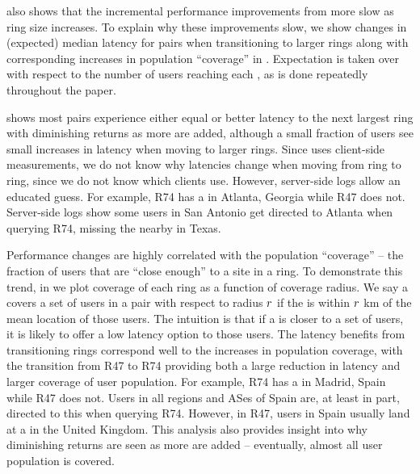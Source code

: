 \documentclass[sigconf,letterpaper,nonacm,10pt,anonymous]{acmart}
\begin{document}
 also shows that the incremental
performance improvements from more \feplural slow as ring size
increases. To explain why these improvements slow, we show changes in
(expected) median latency for \metroas pairs when transitioning to
larger rings along with corresponding increases in population
``coverage'' in .
Expectation is taken over \feplural with respect to the number of users
reaching each \fe, as is done repeatedly throughout the paper.

 shows most
\metroas pairs experience either equal or better latency to the next
largest ring with diminishing returns as more \feplural are added,
although a small fraction of users see small increases in latency when
moving to larger rings. Since
 uses client-side
measurements, we do not know why latencies change when moving from ring
to ring, since we do not know which \feplural clients use. However,
server-side logs allow an educated guess. For example, R74 has a \fe in
Atlanta, Georgia while R47 does not. Server-side logs show some users in
San Antonio get directed to Atlanta when querying R74, missing the
nearby \feplural in Texas.

Performance changes are highly correlated with the population
``coverage'' -- the fraction of users that are ``close enough'' to a
site in a ring. To demonstrate this trend, in
 we plot coverage
of each ring as a function of coverage radius. We say a \fe covers a set
of users in a \metroas pair with respect to radius \(\mathnormal{r}\) if
the \fe is within \(\mathnormal{r}\) km of the mean location of those
users. The intuition is that if a \fe is closer to a set of users, it is
likely to offer a low latency option to those users. The latency
benefits from transitioning rings correspond well to the increases in
population coverage, with the transition from R47 to R74 providing both
a large reduction in latency and larger coverage of user population. For
example, R74 has a \fe in Madrid, Spain while R47 does not. Users in all
regions and ASes of Spain are, at least in part, directed to this
\fe when querying R74. However, in R47, users in Spain usually land at a
\fe in the United Kingdom. This analysis also provides insight into why
diminishing returns are seen as more \feplural are added -- eventually,
almost all user population is covered.
\end{document}
